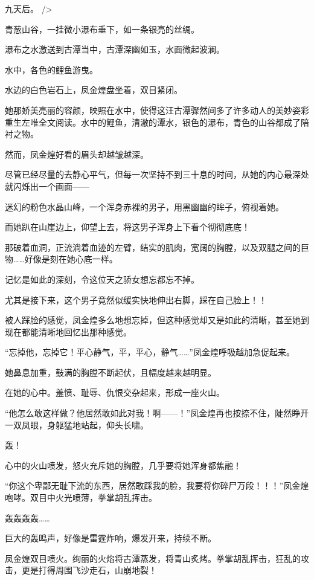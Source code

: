 
\begin{this_body}

九天后。 />

青葱山谷，一挂微小瀑布垂下，如一条银亮的丝绸。

瀑布之水激送到古潭当中，古潭深幽如玉，水面微起波澜。

水中，各色的鲤鱼游曳。

水边的白色岩石上，凤金煌盘坐着，双目紧闭。

她那娇美亮丽的容颜，映照在水中，使得这汪古潭骤然间多了许多动人的美妙姿彩重生左唯全文阅读。水中的鲤鱼，清澈的潭水，银色的瀑布，青色的山谷都成了陪衬之物。

然而，凤金煌好看的眉头却越皱越深。

尽管已经尽量的去静心平气，但每一次坚持不到三十息的时间，从她的内心最深处就闪烁出一个画面——

迷幻的粉色水晶山峰，一个浑身赤裸的男子，用黑幽幽的眸子，俯视着她。

而她趴在山崖边上，仰望上去，将这男子浑身上下看个彻彻底底！

那破着血洞，正流淌着血迹的左臂，结实的肌肉，宽阔的胸膛，以及双腿之间的巨物……好像是刻在她心底一样。

记忆是如此的深刻，令这位天之骄女想忘都忘不掉。

尤其是接下来，这个男子竟然似缓实快地伸出右脚，踩在自己脸上！！

被人踩脸的感觉，凤金煌多么地想忘掉，但这种感觉却又是如此的清晰，甚至她到现在都能清晰地回忆出那种感觉。

“忘掉他，忘掉它！平心静气，平，平心，静气……”凤金煌呼吸越加急促起来。

她鼻息加重，鼓满的胸膛不断起伏，且幅度越来越明显。

在她的心中。羞愤、耻辱、仇恨交杂起来，形成一座火山。

“他怎么敢这样做？他居然敢如此对我！啊——！”凤金煌再也按捺不住，陡然睁开一双凤眼，身躯猛地站起，仰头长啸。

轰！

心中的火山喷发，怒火充斥她的胸膛，几乎要将她浑身都焦融！

“你这个卑鄙无耻下流的东西，居然敢踩我的脸，我要将你碎尸万段！！！”凤金煌咆哮。双目中火光喷薄，拳掌胡乱挥击。

轰轰轰轰……

巨大的轰鸣声，好像是雷霆炸响，爆发开来，持续不断。

凤金煌双目喷火。绚丽的火焰将古潭蒸发，将青山炙烤。拳掌胡乱挥击，狂乱的攻击，更是打得周围飞沙走石，山崩地裂！


\end{this_body}
